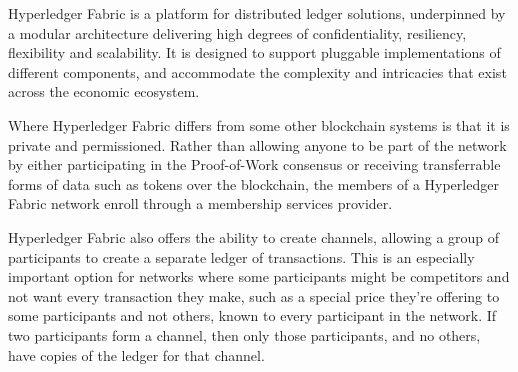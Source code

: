 Hyperledger Fabric is a platform for distributed ledger solutions, underpinned by a modular architecture delivering high degrees of confidentiality, resiliency, flexibility and scalability. It is designed to support pluggable implementations of different components, and accommodate the complexity and intricacies that exist across the economic ecosystem.

Where Hyperledger Fabric differs from some other blockchain systems is that it is private and permissioned. Rather than allowing anyone to be part of the network by either participating in the Proof-of-Work consensus or receiving transferrable forms of data such as tokens over the blockchain, the members of a Hyperledger Fabric network enroll through a membership services provider.

Hyperledger Fabric also offers the ability to create channels, allowing a group of participants to create a separate ledger of transactions. This is an especially important option for networks where some participants might be competitors and not want every transaction they make, such as a special price they're offering to some participants and not others, known to every participant in the network. If two participants form a channel, then only those participants, and no others, have copies of the ledger for that channel.
